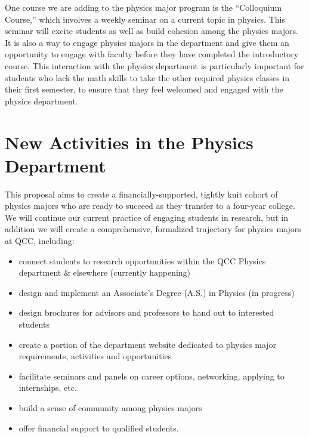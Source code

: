 \documentclass[12pt]{article}
\begin{document}
One course we are adding to the physics major program is the ``Colloquium Course,'' which involves a weekly seminar on a current topic in physics.  This seminar will excite students as well as build cohesion among the physics majors.  It is also a way to engage physics majors in the department and give them an opportunity to engage with faculty before they have completed the introductory course.  This interaction with the physics department is particularly important for students who lack the math skills to take the other required physics classes in their first semester, to ensure that they feel welcomed and engaged with the physics department.

\section{New Activities in the Physics Department}

This proposal aims to create a financially-supported, tightly knit cohort of physics majors who are ready to succeed as they transfer to a four-year college.  We will continue our current practice of engaging students in research, but in addition we will  create a comprehensive, formalized trajectory for physics majors at QCC, including:
\vspace{-2mm}

\begin{itemize}
\setlength{\itemsep}{-\parsep}
\setlength{\topsep}{-\parsep}
\setlength{\partopsep}{-\parsep}
	\item connect students to research opportunities within the QCC Physics department \& elsewhere (currently happening)
	\item design and implement an Associate's Degree (A.S.) in Physics (in progress)
	\item design brochures for advisors and professors to hand out to interested students
	\item create a portion of the department website dedicated to physics major requirements, activities and opportunities
	\item facilitate seminars and panels on career options, networking, applying to internships, etc.
	\item build a sense of community among physics majors 
	\item offer financial support to qualified students.	
\end{itemize}	
	
\end{document}
